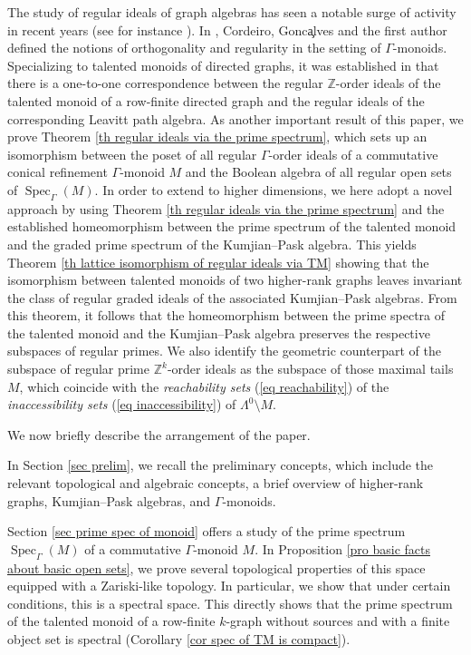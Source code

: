 \documentclass[a4paper,reqno,12pt]{amsart}
\numberwithin{equation}{section}
\theoremstyle{definition}
\theoremstyle{remark}
\newcommand{\Spec}{\operatorname{Spec}}
\begin{document}
The study of regular ideals of graph algebras has seen a notable surge of activity in recent years (see for instance \cite{Pitts,RegLPA,Schenkel}). In \cite{CGHaz}, Cordeiro, Gonc\c alves and the first author defined the notions of orthogonality and regularity in the setting of $\Gamma$-monoids. Specializing to talented monoids of directed graphs, it was established in \cite[Corollary 4.5]{CGHaz} that there is a one-to-one correspondence between the regular $\mathbb{Z}$-order ideals of the talented monoid of a row-finite directed graph and the regular ideals of the corresponding Leavitt path algebra. As another important result of this paper, we prove Theorem \ref{th regular ideals via the prime spectrum}, which sets up an isomorphism between the poset of all regular $\Gamma$-order ideals of a commutative conical refinement $\Gamma$-monoid $M$ and the Boolean algebra of all regular open sets of $\Spec_\Gamma(M)$. In order to extend \cite[Corollary 4.5]{CGHaz} to higher dimensions, we here adopt a novel approach by using Theorem \ref{th regular ideals via the prime spectrum} and the established homeomorphism between the prime spectrum of the talented monoid and the graded prime spectrum of the Kumjian--Pask algebra. This yields Theorem \ref{th lattice isomorphism of regular ideals via TM} showing that the isomorphism between talented monoids of two higher-rank graphs leaves invariant the class of regular graded ideals of the associated Kumjian--Pask algebras. From this theorem, it follows that the homeomorphism between the prime spectra of the talented monoid and the Kumjian--Pask algebra preserves the respective subspaces of regular primes. We also identify the geometric counterpart of the subspace of regular prime $\mathbb{Z}^k$-order ideals as the subspace of those maximal tails $M$, which coincide with the \emph{reachability sets} (\ref{eq reachability}) of the \emph{inaccessibility sets} (\ref{eq inaccessibility}) of $\Lambda^0\setminus M$.   

We now briefly describe the arrangement of the paper. 

In Section \ref{sec prelim}, we recall the preliminary concepts, which include the relevant topological and algebraic concepts, a brief overview of higher-rank graphs, Kumjian--Pask algebras, and $\Gamma$-monoids. 

Section \ref{sec prime spec of monoid} offers a study of the prime spectrum $\Spec_\Gamma(M)$ of a commutative $\Gamma$-monoid $M$. In Proposition \ref{pro basic facts about basic open sets}, we prove several topological properties of this space equipped with a Zariski-like topology. In particular, we show that under certain conditions, this is a spectral space. This directly shows that the prime spectrum of the talented monoid of a row-finite $k$-graph without sources and with a finite object set is spectral (Corollary \ref{cor spec of TM is compact}). 
\end{document}
